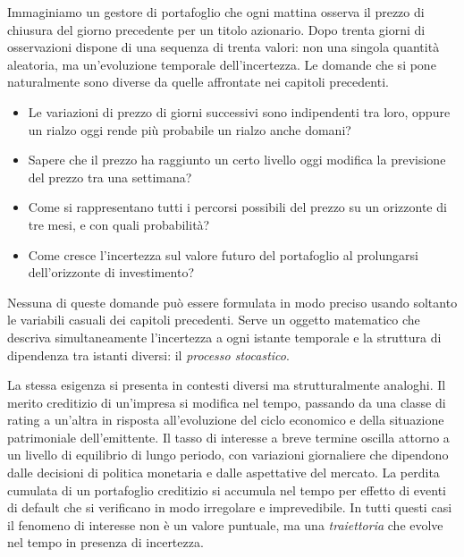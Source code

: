 Immaginiamo un gestore di portafoglio che ogni mattina osserva il prezzo
di chiusura del giorno precedente per un titolo azionario. Dopo trenta
giorni di osservazioni dispone di una sequenza di trenta valori: non una
singola quantit\`{a} aleatoria, ma un'evoluzione temporale dell'incertezza.
Le domande che si pone naturalmente sono diverse da quelle affrontate nei
capitoli precedenti.

\begin{itemize}

\item Le variazioni di prezzo di giorni successivi sono indipendenti tra
loro, oppure un rialzo oggi rende pi\`{u} probabile un rialzo anche domani?

\item Sapere che il prezzo ha raggiunto un certo livello oggi modifica la
previsione del prezzo tra una settimana?

\item Come si rappresentano tutti i percorsi possibili del prezzo su un
orizzonte di tre mesi, e con quali probabilit\`{a}?

\item Come cresce l'incertezza sul valore futuro del portafoglio al
prolungarsi dell'orizzonte di investimento?

\end{itemize}

Nessuna di queste domande pu\`{o} essere formulata in modo preciso usando
soltanto le variabili casuali dei capitoli precedenti. Serve un oggetto
matematico che descriva simultaneamente l'incertezza a ogni istante
temporale e la struttura di dipendenza tra istanti diversi: il
\emph{processo stocastico}.

La stessa esigenza si presenta in contesti diversi ma strutturalmente
analoghi. Il merito creditizio di un'impresa si modifica nel tempo,
passando da una classe di rating a un'altra in risposta all'evoluzione
del ciclo economico e della situazione patrimoniale dell'emittente. Il
tasso di interesse a breve termine oscilla attorno a un livello di
equilibrio di lungo periodo, con variazioni giornaliere che dipendono
dalle decisioni di politica monetaria e dalle aspettative del mercato.
La perdita cumulata di un portafoglio creditizio si accumula nel tempo
per effetto di eventi di default che si verificano in modo irregolare e
imprevedibile. In tutti questi casi il fenomeno di interesse non \`{e}
un valore puntuale, ma una \emph{traiettoria} che evolve nel tempo in
presenza di incertezza.

